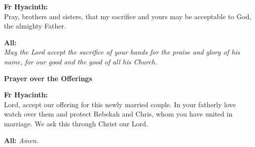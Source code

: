\documentclass[12pt,landscape]{article}
\begin{document}
\begin{multicols}{2}
\vspace{0.5em}

\textbf{Fr Hyacinth:} \\
Pray, brothers and sisters, that my sacrifice and yours may be acceptable to God, the almighty Father.

\vspace{0.5em}

\textbf{All:} \\
\textit{May the Lord accept the sacrifice of your hands for the praise and glory of his name, for our good and the good of all his Church.}

\vspace{1em}

\textbf{Prayer over the Offerings}

\textbf{Fr Hyacinth:} \\
Lord, accept our offering for this newly married couple. In your fatherly love watch over them and protect Rebekah and Chris, whom you have united in marriage. We ask this through Christ our Lord.

\vspace{0.5em}

\textbf{All:} \textit{Amen.}

\end{multicols}

\newpage
\end{document}
